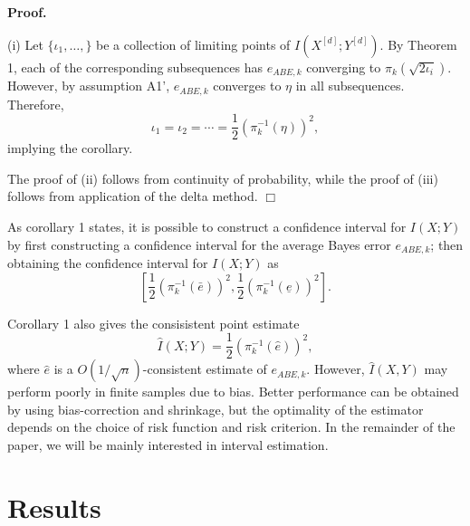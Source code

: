 \documentclass[12pt]{article}
\begin{document}
\textbf{Proof.} 

(i) Let $\{\iota_1,\hdots, \}$ be a collection of limiting points of $I(X^{[d]}; Y^{[d]})$.
By Theorem 1, each of the corresponding subsequences has $e_{ABE, k}$ converging to
$\pi_k(\sqrt{2 \iota_i})$.  However, by assumption A1', $e_{ABE, k}$ converges to $\eta$ in
all subsequences.  Therefore, 
\[\iota_1 = \iota_2 = \cdots = \frac{1}{2}(\pi_k^{-1}(\eta))^2,\]
implying the corollary.

The proof of (ii) follows from continuity of probability, while the proof of (iii) follows from application of the delta method.  $\Box$

As corollary 1 states, it is possible to construct a confidence interval for $I(X; Y)$ by
first constructing a confidence interval for the average Bayes error $e_{ABE,
k}$; then obtaining the confidence interval for $I(X; Y)$ as
\[
[\frac{1}{2}(\pi_k^{-1}(\bar{e}))^2, \frac{1}{2}(\pi_k^{-1}(\underline{e}))^2].
\]

Corollary 1 also gives the consisistent point estimate
\[\hat{I}(X; Y) = \frac{1}{2}(\pi_k^{-1}(\hat{e}))^2,\]
where $\hat{e}$ is a $O(1/\sqrt{n})$-consistent estimate of $e_{ABE,
k}.$ However, $\hat{I}(X, Y)$ may perform poorly in finite samples due
to bias.  Better performance can be obtained by using bias-correction
and shrinkage, but the optimality of the estimator depends on the
choice of risk function and risk criterion.  In the remainder
of the paper, we will be mainly interested in interval estimation.



\section{Results}
\end{document}
